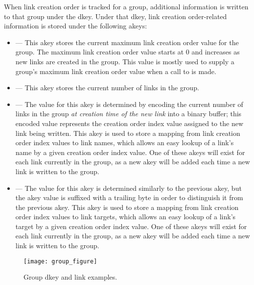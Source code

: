 \documentclass[../design_doc.tex]{subfiles}
\begin{document}
When link creation order is tracked for a group, additional information is written to that group under the  \gls{dkey}. Under that \gls{dkey}, link creation order-related information is stored under the following \glspl{akey}:

\begin{itemize}
    \item {} --- This \gls{akey} stores the current maximum link creation order value for the group. The maximum link creation order value starts at 0 and increases as new links are created in the group. This value is mostly used to supply a group's maximum link creation order value when a call to  is made.
    \item {} --- This \gls{akey} stores the current number of links in the group.
    \item {} --- The value for this \gls{akey} is determined by encoding the current number of links in the group \textit{at creation time of the new link} into a binary buffer; this encoded value represents the creation order index value assigned to the new link being written. This \gls{akey} is used to store a mapping from link creation order index values to link names, which allows an easy lookup of a link's name by a given creation order index value. One of these \glspl{akey} will exist for each link currently in the group, as a new \gls{akey} will be added each time a new link is written to the group.
    \item {} --- The value for this \gls{akey} is determined similarly to the previous \gls{akey}, but the \gls{akey} value is suffixed with a trailing  byte in order to distinguish it from the previous \gls{akey}. This \gls{akey} is used to store a mapping from link creation order index values to link targets, which allows an easy lookup of a link's target by a given creation order index value. One of these \glspl{akey} will exist for each link currently in the group, as a new \gls{akey} will be added each time a new link is written to the group.
\end{itemize}

\begin{figure}
\texttt{[image: group\_figure]}
\caption{Group dkey and link examples.}
\label{fig:group}
\end{figure}
\end{document}
